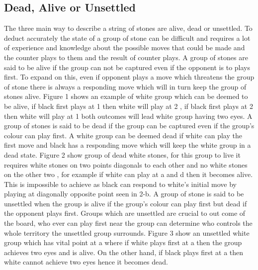 \documentclass{l4proj}
\begin{document}
\subsection{Dead, Alive or Unsettled}

The three main way to describe a string of stones are alive, dead or unsettled. To deduct accurately the state of a group of stone can be difficult and requires a lot of experience and knowledge about the possible moves that could be made and the counter plays to them and the result of counter plays.
A group of stones are said to be alive if the group can not be captured even if the opponent is to plays first. To expand on this, even if opponent plays a move which threatens the group of stone there is always a responding move which will in turn keep the group of stones alive. Figure 1 shows an example of white group which can be deemed to be alive, if black first plays at 1 then white will play at 2 , if black first plays at 2 then white will play at 1 both outcomes will lead white group having two eyes.
A group of  stones is said to be dead if the group can be captured even if the group’s colour can play first. A white group can be deemed dead if white can play the first move and black has a responding move which will keep the white group in a dead state. Figure 2 show group of dead white stones, for this group to live it requires white stones on two points diagonals to each other and no white stones on the other two , for example if white can play at a and d then it becomes alive. This is impossible to achieve as black can respond to white’s initial move by playing at diagonally opposite point seen in 2-b.
A group of stone is said  to be unsettled when the group is alive  if the group’s colour can play first but dead if the opponent plays first. Groups which are unsettled are crucial to out come of the board, who ever can play first near the group can determine who controls the whole territory the unsettled group surrounds. Figure 3 show an unsettled white group which has vital point at a where if white plays first at a then the group achieves two eyes and is alive. On the other hand, if black plays first at a then white cannot achieve two eyes hence it becomes dead.
\end{document}

